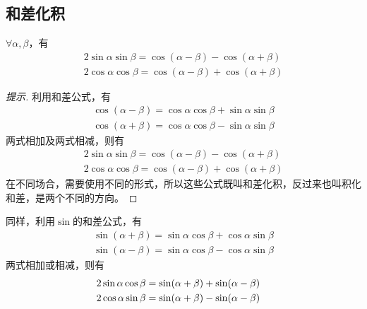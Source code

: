 \subsection{和差化积}
\label{sec:product-to-sum}

\begin{theorem}
  $\forall \alpha, \beta$，有
  \begin{align*}
    2\sin\alpha\sin\beta = \cos(\alpha-\beta) - \cos(\alpha+\beta)\\
    2\cos\alpha\cos\beta = \cos(\alpha-\beta) + \cos(\alpha+\beta)
  \end{align*}
\end{theorem}
\begin{proof}[提示]
  利用和差公式，有
  \begin{align*}
    \cos(\alpha-\beta) = \cos\alpha\cos\beta + \sin\alpha\sin\beta \\
    \cos(\alpha+\beta) = \cos\alpha\cos\beta - \sin\alpha\sin\beta
  \end{align*}
  两式相加及两式相减，则有
  \begin{align*}
    2\sin\alpha\sin\beta = \cos(\alpha-\beta) - \cos(\alpha+\beta) \\
    2\cos\alpha\cos\beta = \cos(\alpha-\beta) + \cos(\alpha+\beta)
  \end{align*}
  在不同场合，需要使用不同的形式，所以这些公式既叫和差化积，反过来也叫积化和差，是两个不同的方向。
\end{proof}

\begin{example}
  同样，利用$\sin$的和差公式，有
  \begin{align*}
    \sin(\alpha+\beta) = \sin\alpha\cos\beta + \cos\alpha\sin\beta \\
    \sin(\alpha-\beta) = \sin\alpha\cos\beta - \cos\alpha\sin\beta
  \end{align*}
  两式相加或相减，则有
  \begin{align*}
    2 \sin\alpha\cos\beta = \sin(\alpha + \beta) + \sin(\alpha - \beta)\\
    2 \cos\alpha\sin\beta = \sin(\alpha + \beta) - \sin(\alpha - \beta)&\qedhere
  \end{align*}
\end{example}

